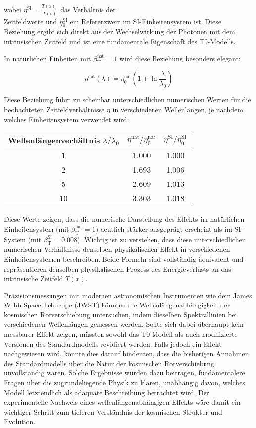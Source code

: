 \documentclass[12pt,a4paper]{article}
\newcommand{\Tfield}{T(x)}
\newcommand{\betaT}{\beta_{\text{T}}}
\begin{document}
	wobei \(\eta^{\text{SI}} = \frac{\Tfield_0}{\Tfield}\) das Verhältnis der\\ Zeitfeldwerte und \(\eta_0^{\text{SI}}\) ein Referenzwert im SI-Einheitensystem ist. Diese Beziehung ergibt sich direkt aus der Wechselwirkung der Photonen mit dem intrinsischen Zeitfeld und ist eine fundamentale Eigenschaft des T0-Modells.
	
	In natürlichen Einheiten mit \(\betaT^{\text{nat}} = 1\) wird diese Beziehung besonders elegant:
	
	\begin{equation}
		\eta^{\text{nat}}(\lambda) = \eta_0^{\text{nat}} \left(1 + \ln \frac{\lambda}{\lambda_0}\right)
	\end{equation}
	
	Diese Beziehung führt zu scheinbar unterschiedlichen numerischen Werten für die beobachteten Zeitfeldverhältnisse \(\eta\) in verschiedenen Wellenlängen, je nachdem welches Einheitensystem verwendet wird:
	
	\begin{center}
		\begin{tabular}{|c|c|c|}
			\hline
			\textbf{Wellenlängenverhältnis \(\lambda/\lambda_0\)} & \textbf{\(\eta^{\text{nat}}/\eta_0^{\text{nat}}\)} & \textbf{\(\eta^{\text{SI}}/\eta_0^{\text{SI}}\)} \\
			\hline
			1 & 1.000 & 1.000 \\
			2 & 1.693 & 1.006 \\
			5 & 2.609 & 1.013 \\
			10 & 3.303 & 1.018 \\
			\hline
		\end{tabular}
	\end{center}
	
	Diese Werte zeigen, dass die numerische Darstellung des Effekts im natürlichen Einheitensystem (mit \(\betaT^{\text{nat}} = 1\)) deutlich stärker ausgeprägt erscheint als im SI-System (mit \(\betaT^{\text{SI}} = 0.008\)). Wichtig ist zu verstehen, dass diese unterschiedlichen numerischen Verhältnisse denselben physikalischen Effekt in verschiedenen Einheitensystemen beschreiben. Beide Formeln sind vollständig äquivalent und repräsentieren denselben physikalischen Prozess des Energieverlusts an das intrinsische Zeitfeld \(\Tfield\).
	
	Präzisionsmessungen mit modernen astronomischen Instrumenten wie dem James Webb Space Telescope (JWST) könnten die Wellenlängenabhängigkeit der kosmischen Rotverschiebung untersuchen, indem dieselben Spektrallinien bei verschiedenen Wellenlängen gemessen werden. Sollte sich dabei überhaupt kein messbarer Effekt zeigen, müssten sowohl das T0-Modell als auch modifizierte Versionen des Standardmodells revidiert werden. Falls jedoch ein Effekt nachgewiesen wird, könnte dies darauf hindeuten, dass die bisherigen Annahmen des Standardmodells über die Natur der kosmischen Rotverschiebung unvollständig waren. Solche Ergebnisse würden dazu beitragen, fundamentalere Fragen über die zugrundeliegende Physik zu klären, unabhängig davon, welches Modell letztendlich als adäquate Beschreibung betrachtet wird. Der experimentelle Nachweis eines wellenlängenabhängigen Effekts wäre damit ein wichtiger Schritt zum tieferen Verständnis der kosmischen Struktur und Evolution.
	
\end{document}
